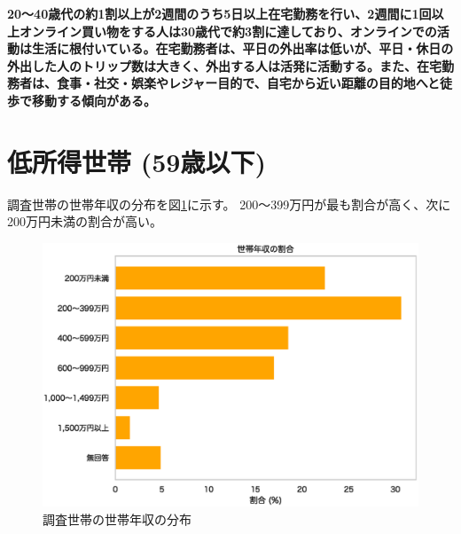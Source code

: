 \documentclass[a4paper,12pt, uplatex]{jsbook}
\begin{document}
\color{red}
\begin{framed}
\noindent
\textbf{\large 20〜40歳代の約1割以上が2週間のうち5日以上在宅勤務を行い、2週間に1回以上オンライン買い物をする人は30歳代で約3割に達しており、オンラインでの活動は生活に根付いている。在宅勤務者は、平日の外出率は低いが、平日・休日の外出した人のトリップ数は大きく、外出する人は活発に活動する。また、在宅勤務者は、食事・社交・娯楽やレジャー目的で、自宅から近い距離の目的地へと徒歩で移動する傾向がある。}
\end{framed}
\color{black}



\clearpage
\section{低所得世帯 (59歳以下)}
調査世帯の世帯年収の分布を図\ref{fig:income}に示す。
200〜399万円が最も割合が高く、次に200万円未満の割合が高い。
%
\begin{figure}[H]
    \centering
    \includegraphics[width=1.0\textwidth]{picture/income.eps}
    \caption{調査世帯の世帯年収の分布}
    \label{fig:income}
\end{figure}
\end{document}
